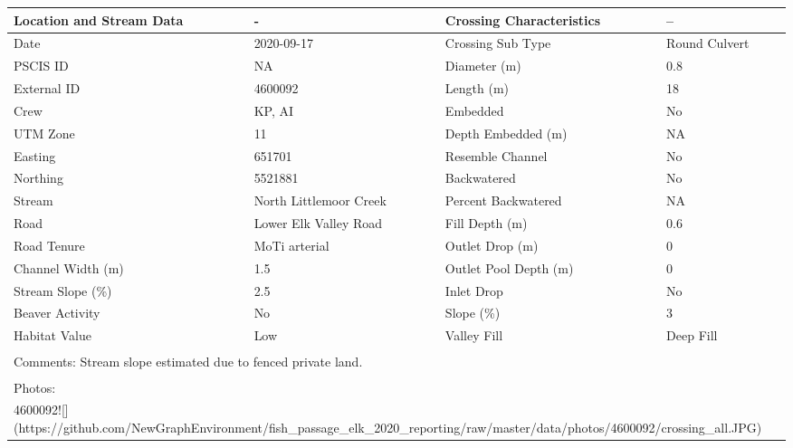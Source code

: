\documentclass[
]{book}
\begin{document}
\begin{tabular}{l|l|l|l}
\hline
Location and Stream Data & - & Crossing Characteristics & --\\
\hline
Date & 2020-09-17 & Crossing Sub Type & Round Culvert\\
\hline
PSCIS ID & NA & Diameter (m) & 0.8\\
\hline
External ID & 4600092 & Length (m) & 18\\
\hline
Crew & KP, AI & Embedded & No\\
\hline
UTM Zone & 11 & Depth Embedded (m) & NA\\
\hline
Easting & 651701 & Resemble Channel & No\\
\hline
Northing & 5521881 & Backwatered & No\\
\hline
Stream & North Littlemoor Creek & Percent Backwatered & NA\\
\hline
Road & Lower Elk Valley Road & Fill Depth (m) & 0.6\\
\hline
Road Tenure & MoTi arterial & Outlet Drop (m) & 0\\
\hline
Channel Width (m) & 1.5 & Outlet Pool Depth (m) & 0\\
\hline
Stream Slope (\%) & 2.5 & Inlet Drop & No\\
\hline
Beaver Activity & No & Slope (\%) & 3\\
\hline
Habitat Value & Low & Valley Fill & Deep Fill\\
\hline
\multicolumn{4}{l}{\textsuperscript{} Comments: Stream slope estimated due to fenced private land.}\\
\multicolumn{4}{l}{\textsuperscript{} Photos:}\\
\multicolumn{4}{l}{4600092![](https://github.com/NewGraphEnvironment/fish\_passage\_elk\_2020\_reporting/raw/master/data/photos/4600092/crossing\_all.JPG)}\\
\end{tabular}
\end{document}
